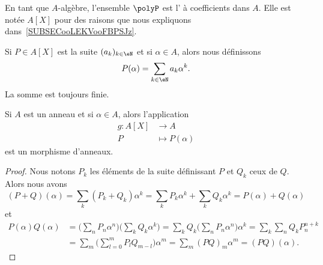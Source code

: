 \begin{definition}  \label{DefRGOooGIVzkx}
    En tant que \( A\)-algèbre, l'ensemble \( \polyP\) est l' à coefficients dans \( A\). Elle est notée \( A[X]\) pour des raisons que nous expliquons dans~\ref{SUBSECooLEKVooFBPSJz}.
\end{definition}

\begin{definition}      \label{DEFooOSWQooHYYwVE}
    Si \( P\in A[X]\) est la suite \( (a_k)_{k\in \eN}\) et si \( \alpha\in A\), alors nous définissons
    \begin{equation}
        P(\alpha)=\sum_{k\in \eN}a_k\alpha^k.
    \end{equation}
    La somme est toujours finie.
\end{definition}

\begin{lemma}       \label{LEMooSFGGooGeVerf}
    Si \( A\) est un anneau et si \( \alpha\in A\), alors l'application
    \begin{equation}
        \begin{aligned}
            g\colon A[X]&\to A \\
            P&\mapsto P(\alpha)
        \end{aligned}
    \end{equation}
    est un morphisme d'anneaux.
\end{lemma}

\begin{proof}
    Nous notons \( P_k\) les éléments de la suite définissant \( P\) et \( Q_k\) ceux de \( Q\). Alors nous avons
    \begin{equation}
        (P+Q)(\alpha)=\sum_k(P_k+Q_k)\alpha^k=\sum_kP_k\alpha^k+\sum_kQ_k\alpha^k=P(\alpha)+Q(\alpha)
    \end{equation}
    et
    \begin{subequations}
        \begin{align}
            P(\alpha)Q(\alpha)&=\big( \sum_nP_n\alpha^n \big)\big( \sum_kQ_k\alpha^k \big)=\sum_kQ_k\big( \sum_nP_n\alpha^n \big)\alpha^k=\sum_k\sum_nQ_kP_n^{n+k}\\
            &=\sum_m\big( \sum_{l=0}^mP_lQ_{m-l} \big)\alpha^m=\sum_m(PQ)_m\alpha^m=(PQ)(\alpha).
        \end{align}
    \end{subequations}
\end{proof}


